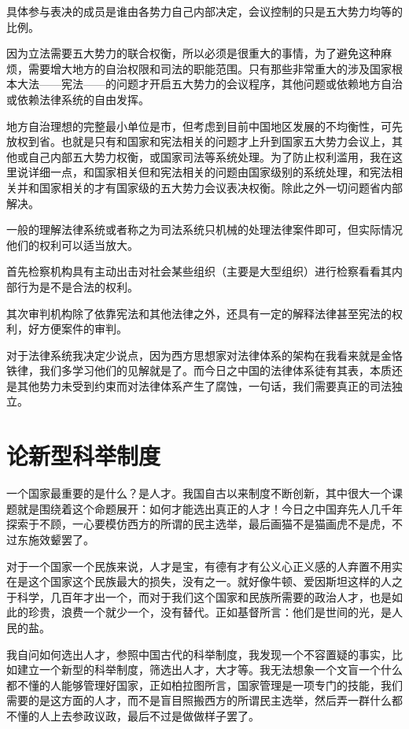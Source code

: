\documentclass[11pt,oneside]{article}
\begin{document}
\begin{common-format}
具体参与表决的成员是谁由各势力自己内部决定，会议控制的只是五大势力均等的比例。

因为立法需要五大势力的联合权衡，所以必须是很重大的事情，为了避免这种麻烦，需要增大地方的自治权限和司法的职能范围。只有那些非常重大的涉及国家根本大法——宪法——的问题才开启五大势力的会议程序，其他问题或依赖地方自治或依赖法律系统的自由发挥。

地方自治理想的完整最小单位是市，但考虑到目前中国地区发展的不均衡性，可先放权到省。也就是只有和国家和宪法相关的问题才上升到国家五大势力会议上，其他或自己内部五大势力权衡，或国家司法等系统处理。为了防止权利滥用，我在这里说详细一点，和国家相关但和宪法相关的问题由国家级别的系统处理，和宪法相关并和国家相关的才有国家级的五大势力会议表决权衡。除此之外一切问题省内部解决。

一般的理解法律系统或者称之为司法系统只机械的处理法律案件即可，但实际情况他们的权利可以适当放大。

首先检察机构具有主动出击对社会某些组织（主要是大型组织）进行检察看看其内部行为是不是合法的权利。

其次审判机构除了依靠宪法和其他法律之外，还具有一定的解释法律甚至宪法的权利，好方便案件的审判。

对于法律系统我决定少说点，因为西方思想家对法律体系的架构在我看来就是金恪铁律，我们多学习他们的见解就是了。而今日之中国的法律体系徒有其表，本质还是其他势力未受到约束而对法律体系产生了腐蚀，一句话，我们需要真正的司法独立。



\section{论新型科举制度}
一个国家最重要的是什么？是人才。我国自古以来制度不断创新，其中很大一个课题就是围绕着这个命题展开：如何才能选出真正的人才！今日之中国弃先人几千年探索于不顾，一心要模仿西方的所谓的民主选举，最后画猫不是猫画虎不是虎，不过东施效颦罢了。

对于一个国家一个民族来说，人才是宝，有德有才有公义心正义感的人弃置不用实在是这个国家这个民族最大的损失，没有之一。就好像牛顿、爱因斯坦这样的人之于科学，几百年才出一个，而对于我们这个国家和民族所需要的政治人才，也是如此的珍贵，浪费一个就少一个，没有替代。正如基督所言：他们是世间的光，是人民的盐。

我自问如何选出人才，参照中国古代的科举制度，我发现一个不容置疑的事实，比如建立一个新型的科举制度，筛选出人才，大才等。我无法想象一个文盲一个什么都不懂的人能够管理好国家，正如柏拉图所言，国家管理是一项专门的技能，我们需要的是这方面的人才，而不是盲目照搬西方的所谓民主选举，然后弄一群什么都不懂的人上去参政议政，最后不过是做做样子罢了。


\end{common-format}
\end{document}

